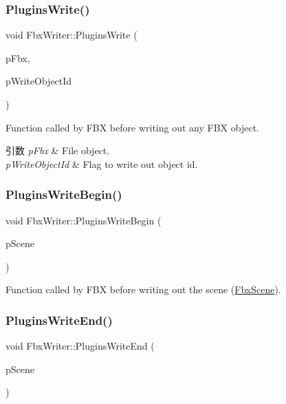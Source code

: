 \subsubsection{\texorpdfstring{Plugins\+Write()}{PluginsWrite()}}
{\footnotesize\ttfamily void Fbx\+Writer\+::\+Plugins\+Write (\begin{DoxyParamCaption}\item[{\hyperlink{class_fbx_i_o}{Fbx\+IO} \&}]{p\+Fbx,  }\item[{bool}]{p\+Write\+Object\+Id }\end{DoxyParamCaption})\hspace{0.3cm}{\ttfamily [protected]}}

Function called by F\+BX before writing out any F\+BX object. 
\begin{DoxyParams}{引数}
{\em p\+Fbx} & File object. \\
\hline
{\em p\+Write\+Object\+Id} & Flag to write out object id. \\
\hline
\end{DoxyParams}
\mbox{\label{class_fbx_writer_a33b44e856c07510bddf658fd446789d1}} 
\subsubsection{\texorpdfstring{Plugins\+Write\+Begin()}{PluginsWriteBegin()}}
{\footnotesize\ttfamily void Fbx\+Writer\+::\+Plugins\+Write\+Begin (\begin{DoxyParamCaption}\item[{\hyperlink{class_fbx_scene}{Fbx\+Scene} \&}]{p\+Scene }\end{DoxyParamCaption})\hspace{0.3cm}{\ttfamily [protected]}}



Function called by F\+BX before writing out the scene (\hyperlink{class_fbx_scene}{Fbx\+Scene}). 

\mbox{\label{class_fbx_writer_a85e89b71d39755ef0a426aa7b35221d6}} 
\subsubsection{\texorpdfstring{Plugins\+Write\+End()}{PluginsWriteEnd()}}
{\footnotesize\ttfamily void Fbx\+Writer\+::\+Plugins\+Write\+End (\begin{DoxyParamCaption}\item[{\hyperlink{class_fbx_scene}{Fbx\+Scene} \&}]{p\+Scene }\end{DoxyParamCaption})\hspace{0.3cm}{\ttfamily [protected]}}



